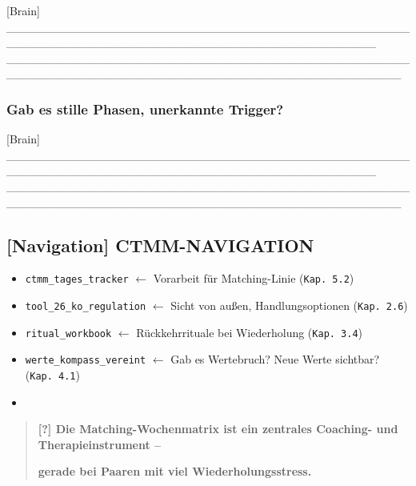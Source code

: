 [Brain] \_\_\_\_\_\_\_\_\_\_\_\_\_\_\_\_\_\_\_\_\_\_\_\_\_\_\_\_\_\_\_\_\_\_\_\_\_\_\_\_\_\_\_\_\_\_\_\_\_\_\_\_\_\_\_\_\_\_\_\_\_\_\_\_\_\_\_\_\_\_\_\_\_\_\_\_\_\_\_\_\_\_\_\_\_\_\_\_\_\_\_\_ \_\_\_\_\_\_\_\_\_\_\_\_\_\_\_\_\_\_\_\_\_\_\_\_\_\_\_\_\_\_\_\_\_\_\_\_\_\_\_\_\_\_\_\_\_\_\_\_\_\_\_\_\_\_\_\_\_\_\_\_\_\_\_\_\_\_\_\_\_\_\_\_\_\_\_\_\_\_\_\_\_\_\_\_\_\_\_\_\_\_\_\_\_\_\_

\hypertarget{gab-es-stille-phasen-unerkannte-trigger}{%
\subsubsection{\texorpdfstring{\textbf{Gab es stille Phasen, unerkannte Trigger?}}{Gab es stille Phasen, unerkannte Trigger?}}\label{gab-es-stille-phasen-unerkannte-trigger}}

[Brain] \_\_\_\_\_\_\_\_\_\_\_\_\_\_\_\_\_\_\_\_\_\_\_\_\_\_\_\_\_\_\_\_\_\_\_\_\_\_\_\_\_\_\_\_\_\_\_\_\_\_\_\_\_\_\_\_\_\_\_\_\_\_\_\_\_\_\_\_\_\_\_\_\_\_\_\_\_\_\_\_\_\_\_\_\_\_\_\_\_\_\_\_ \_\_\_\_\_\_\_\_\_\_\_\_\_\_\_\_\_\_\_\_\_\_\_\_\_\_\_\_\_\_\_\_\_\_\_\_\_\_\_\_\_\_\_\_\_\_\_\_\_\_\_\_\_\_\_\_\_\_\_\_\_\_\_\_\_\_\_\_\_\_\_\_\_\_\_\_\_\_\_\_\_\_\_\_\_\_\_\_\_\_\_\_\_\_\_

\hypertarget{ctmm-navigation}{%
\subsection{\texorpdfstring{\textbf{[Navigation] CTMM-NAVIGATION}}{[Navigation] CTMM-NAVIGATION}}\label{ctmm-navigation}}

\begin{itemize}
\tightlist
\item
  \texttt{ctmm\_tages\_tracker} $\leftarrow$ Vorarbeit für Matching-Linie (\texttt{Kap.\ 5.2})
\item
  \texttt{tool\_26\_ko\_regulation} $\leftarrow$ Sicht von außen, Handlungsoptionen (\texttt{Kap.\ 2.6})
\item
  \texttt{ritual\_workbook} $\leftarrow$ Rückkehrrituale bei Wiederholung (\texttt{Kap.\ 3.4})
\item
  \texttt{werte\_kompass\_vereint} $\leftarrow$ Gab es Wertebruch? Neue Werte sichtbar? (\texttt{Kap.\ 4.1})
\item
\end{itemize}

\begin{quote}
\textbf{[?] Die Matching-Wochenmatrix ist ein zentrales Coaching- und Therapieinstrument --}

\textbf{gerade bei Paaren mit viel Wiederholungsstress.}
\end{quote}
